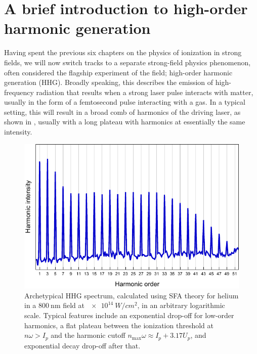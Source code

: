 





\chapter{A brief introduction to high-order harmonic generation}
\label{chap:HHG-intro}

Having spent the previous six chapters on the physics of ionization in strong fields, we will now switch tracks to a separate strong-field physics phenomenon, often considered the flagship experiment of the field; high-order harmonic generation (HHG). Broadly speaking, this describes the emission of high-frequency radiation that results when a strong laser pulse interacts with matter, usually in the form of a femtosecond pulse interacting with a gas. In a typical setting, this will result in a broad comb of harmonics of the driving laser, as shown in , usually with a long plateau with harmonics at essentially the same intensity.

\begin{figure}[htb]
  \centering
  \includegraphics[scale=1]{7-HHG-intro/Figures/figure7B.pdf}
  \caption[
  Archetypical HHG spectrum
  ]{
  Archetypical HHG spectrum, calculated using SFA theory for helium in a $\SI{800}{\nano\meter}$ field at $\SI{e14}{W/cm^2}$, in an arbitrary logarithmic scale. Typical features include an exponential drop-off for low-order harmonics, a flat plateau between the ionization threshold at $n\omega>I_p$ and the harmonic cutoff $n_\mathrm{max}\omega\approx I_p+3.17U_p$, and exponential decay drop-off after that.
  }
\label{f7-standard-harmonic-spectrum}
\end{figure}



